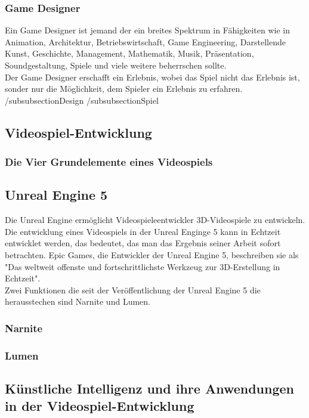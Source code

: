 \documentclass[12pt,a4paper,bibliography=totocnumbered,listof=totocnumbered]{scrartcl}
\begin{document}
\subsubsection{Game Designer} %
Ein Game Designer ist jemand der ein breites Spektrum in Fähigkeiten wie in Animation, Architektur, Betriebswirtschaft, Game Engineering, Darstellende Kunst, Geschichte, Management, Mathematik, Musik, Präsentation, Soundgestaltung, Spiele und viele weitere beherrschen sollte.\\
Der Game Designer erschafft ein Erlebnis, wobei das Spiel nicht das Erlebnis ist, sonder nur die Möglichkeit, dem Spieler ein Erlebnis zu erfahren.
/subsubsection{Design}%
/subsubsection{Spiel}%
\subsection{Videospiel-Entwicklung}
\subsubsection{Die Vier Grundelemente eines Videospiels}%
\subsection{Unreal Engine 5}%
Die Unreal Engine ermöglicht Videospieleentwickler 3D-Videospiele zu entwickeln. Die entwicklung eines Videospiels in der Unreal Enginge 5 kann in Echtzeit entwicklet werden, das bedeutet, das man das Ergebnis seiner Arbeit sofort betrachten. Epic Games, die Entwickler der Unreal Engine 5, beschreiben sie als "Das weltweit offenste und fortschrittlichste Werkzeug zur 3D-Erstellung in Echtzeit".\\
Zwei Funktionen die seit der Veröffentlichung der Unreal Engine 5 die herausstechen sind Narnite und Lumen.
\subsubsection{Narnite}
\subsubsection{Lumen}
\subsection{Künstliche Intelligenz und ihre Anwendungen in der Videospiel-Entwicklung}
\end{document}

